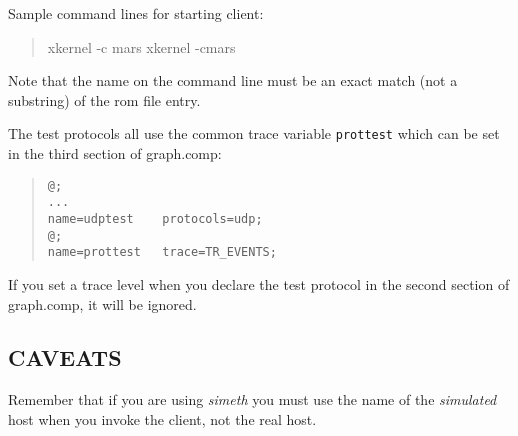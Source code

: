 Sample command lines for starting client:
\begin{quote}
\begin{tt}
xkernel -c mars
xkernel -cmars
\end{tt}
\end{quote}

\noindent
Note that the name on the command line must be an exact match (not a
substring) of the rom file entry.

The test protocols all use the common trace variable {\tt prottest}
which can be set in the third section of graph.comp:

\begin{quote}
\begin{verbatim}
@;
...
name=udptest	protocols=udp;
@;
name=prottest	trace=TR_EVENTS;
\end{verbatim}
\end{quote}


\noindent
If you set a
trace level when you declare the test protocol in the second section
of graph.comp, it will be ignored. 


\subsection*{CAVEATS}
Remember that if you are using {\em simeth} you must use the name of
the {\em simulated} host when you invoke the client, not the real host.
